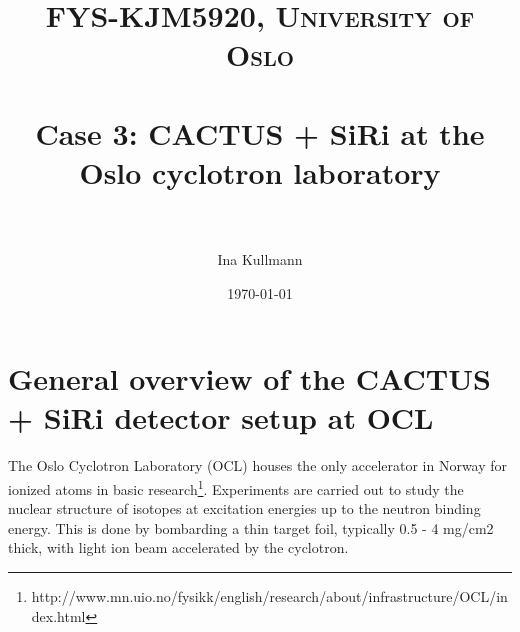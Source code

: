 \documentclass[paper=a4, fontsize=11pt]{scrartcl} %
\title{	
\normalfont \normalsize 
\textsc{FYS-KJM5920, University of Oslo} \\ [25pt] %
\horrule{0.5pt} \\[0.4cm] %
\huge Case 3: CACTUS + SiRi at the Oslo cyclotron laboratory  \\ %
\horrule{2pt} \\[0.5cm] %
}
\author{Ina Kullmann} %
\date{\normalsize\today} %
\begin{document}
\maketitle %








\section{General overview of the CACTUS + SiRi detector setup at OCL}


The Oslo Cyclotron Laboratory (OCL) houses the only accelerator in Norway for ionized atoms in basic research\footnote{http://www.mn.uio.no/fysikk/english/research/about/infrastructure/OCL/index.html}. Experiments are carried out to study the nuclear structure of isotopes at excitation energies up to the neutron binding energy. This is done by bombarding a thin target foil, typically 0.5 - 4 mg/cm2 thick, with light ion beam accelerated by the cyclotron.
\end{document}

